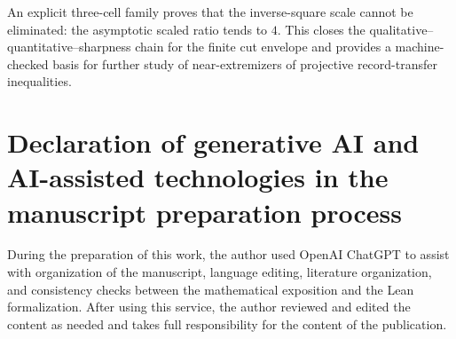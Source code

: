 \documentclass[11pt]{article}
\begin{document}
An explicit three-cell family proves that the inverse-square scale cannot be
eliminated: the asymptotic scaled ratio tends to $4$.  This closes the
qualitative--quantitative--sharpness chain for the finite cut envelope and
provides a machine-checked basis for further study of near-extremizers of
projective record-transfer inequalities.

\section*{Declaration of generative AI and AI-assisted technologies in the manuscript preparation process}

During the preparation of this work, the author used OpenAI ChatGPT to assist
with organization of the manuscript, language editing, literature
organization, and consistency checks between the mathematical exposition and
the Lean formalization. After using this service, the author reviewed and
edited the content as needed and takes full responsibility for the content of
the publication.



\end{document}
